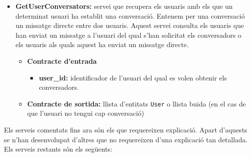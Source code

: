 \begin{itemize}
			\item \textbf{GetUserConversators:} servei que recupera els usuaris amb els que un determinat usuari ha establit una conversació. Entenem per una conversació un missatge directe entre dos usuaris. Aquest servei consulta els usuaris que han enviat un missatge a l'usuari del qual s'han solicitat els conversadors o els usuaris als quals aquest ha enviat un missatge directe.
			
				\begin{itemize}
					\item \textbf{Contracte d'entrada}
						\begin{itemize}
							\item \textbf{user\_id:} identificador de l'usuari del qual es volen obtenir els conversadors.
						\end{itemize}
					\item \textbf{Contracte de sortida:} llista d'entitats \texttt{User} o llista buida (en el cas de que l'usuari no tengui cap conversació)
				\end{itemize}
			
		\end{itemize}
		
		Els serveis comentats fins ara són els que requereixen explicació. Apart d'aquests se n'han desenvolupat d'altres que no requereixen d'una explicació tan detallada. Els serveis restants són els següents:
		
